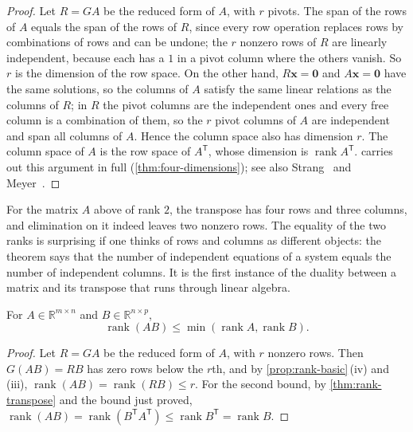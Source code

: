 \begin{proof}
Let $R=GA$ be the reduced form of $A$, with $r$ pivots. The span of the rows of $A$ equals the span of the rows of $R$, since every row operation replaces rows by combinations of rows and can be undone; the $r$ nonzero rows of $R$ are linearly independent, because each has a $1$ in a pivot column where the others vanish. So $r$ is the dimension of the row space. On the other hand, $R\mathbf x=\mathbf 0$ and $A\mathbf x=\mathbf 0$ have the same solutions, so the columns of $A$ satisfy the same linear relations as the columns of $R$; in $R$ the pivot columns are the independent ones and every free column is a combination of them, so the $r$ pivot columns of $A$ are independent and span all columns of $A$. Hence the column space also has dimension $r$. The column space of $A$ is the row space of $A^{\mathsf T}$, whose dimension is $\operatorname{rank}A^{\mathsf T}$.  carries out this argument in full (\cref{thm:four-dimensions}); see also Strang~\cite[Chap.~3]{strang2016} and Meyer~\cite[Chap.~4]{meyer2000}.
\end{proof}

For the matrix $A$ above of rank $2$, the transpose has four rows and three columns, and elimination on it indeed leaves two nonzero rows. The equality of the two ranks is surprising if one thinks of rows and columns as different objects: the theorem says that the number of independent equations of a system equals the number of independent columns. It is the first instance of the duality between a matrix and its transpose that runs through linear algebra.

\begin{proposition}
\label{prop:rank-product}
For $A\in\mathbb R^{m\times n}$ and $B\in\mathbb R^{n\times p}$,
\[
\operatorname{rank}(AB)\le\min(\operatorname{rank}A,\operatorname{rank}B).
\]
\end{proposition}

\begin{proof}
Let $R=GA$ be the reduced form of $A$, with $r$ nonzero rows. Then $G(AB)=RB$ has zero rows below the $r$th, and by \cref{prop:rank-basic}\,(iv) and (iii), $\operatorname{rank}(AB)=\operatorname{rank}(RB)\le r$. For the second bound, by \cref{thm:rank-transpose} and the bound just proved, $\operatorname{rank}(AB)=\operatorname{rank}(B^{\mathsf T}A^{\mathsf T})\le\operatorname{rank}B^{\mathsf T}=\operatorname{rank}B$.
\end{proof}

